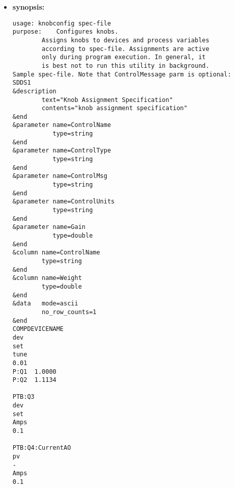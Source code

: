 \begin{itemize}
\item {\bf synopsis:} 
%
%
\begin{verbatim}
usage: knobconfig spec-file
purpose:	Configures knobs.
		Assigns knobs to devices and process variables
		according to spec-file. Assignments are active
		only during program execution. In general, it 
		is best not to run this utility in background.
Sample spec-file. Note that ControlMessage parm is optional:
SDDS1 
&description 
        text="Knob Assignment Specification" 
        contents="knob assignment specification" 
&end 
&parameter name=ControlName 
           type=string  
&end 
&parameter name=ControlType 
           type=string 
&end 
&parameter name=ControlMsg 
           type=string 
&end 
&parameter name=ControlUnits 
           type=string 
&end 
&parameter name=Gain 
           type=double 
&end 
&column name=ControlName 
        type=string 
&end 
&column name=Weight 
        type=double 
&end 
&data   mode=ascii 
        no_row_counts=1 
&end 
COMPDEVICENAME 
dev 
set 
tune 
0.01 
P:Q1  1.0000 
P:Q2  1.1134 
 
PTB:Q3 
dev 
set 
Amps 
0.1 
 
PTB:Q4:CurrentAO 
pv 
- 
Amps 
0.1 
 
\end{verbatim}


\end{itemize}
